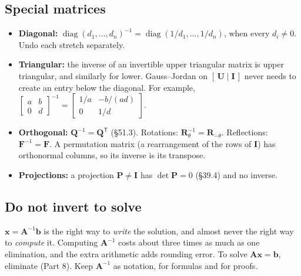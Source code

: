 \documentclass[11pt]{article}
\theoremstyle{plain}
\theoremstyle{definition}
\theoremstyle{remark}
\newcommand{\vc}[1]{\mathbf{#1}}
\newcommand{\mt}[1]{\mathbf{#1}}
\newcommand{\T}{^{\mathsf{T}}}
\DeclareMathOperator{\diagop}{diag}
\begin{document}
\subsection{Special matrices}
\begin{itemize}[leftmargin=1.4em,itemsep=3pt]
  \item \textbf{Diagonal:} $\diagop(d_1,\dots,d_n)^{-1}=\diagop(1/d_1,\dots,1/d_n)$,
        when every $d_i\neq0$. Undo each stretch separately.
  \item \textbf{Triangular:} the inverse of an invertible upper triangular matrix
        is upper triangular, and similarly for lower. Gauss--Jordan on
        $[\,\mt{U}\mid\mt{I}\,]$ never needs to create an entry below the diagonal.
        For example,
        $\begin{bmatrix}a&b\\0&d\end{bmatrix}^{-1}=\begin{bmatrix}1/a&-b/(ad)\\0&1/d\end{bmatrix}$.
  \item \textbf{Orthogonal:} $\mt{Q}^{-1}=\mt{Q}\T$ (\S51.3). Rotations:
        $\mt{R}_\theta^{-1}=\mt{R}_{-\theta}$. Reflections: $\mt{F}^{-1}=\mt{F}$.
        A permutation matrix (a rearrangement of the rows of $\mt{I}$) has
        orthonormal columns, so its inverse is its transpose.
  \item \textbf{Projections:} a projection $\mt{P}\neq\mt{I}$ has $\det\mt{P}=0$
        (\S39.4) and no inverse.
\end{itemize}

\subsection{Do not invert to solve}
$\vc{x}=\mt{A}^{-1}\vc{b}$ is the right way to \emph{write} the solution, and
almost never the right way to \emph{compute} it. Computing $\mt{A}^{-1}$ costs
about three times as much as one elimination, and the extra arithmetic adds
rounding error. To solve $\mt{A}\vc{x}=\vc{b}$, eliminate (Part 8). Keep
$\mt{A}^{-1}$ as notation, for formulas and for proofs.

\end{document}
